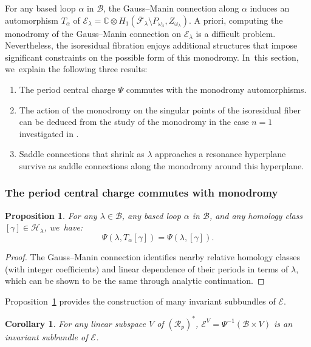 \documentclass[11pt]{article}
\newcommand{\Subsubsection}{\subsubsection}
\newcommand\calH{{\mathcal H}}
\newtheorem{cor}[thm]{Corollary}
\newtheorem{prop}[thm]{Proposition}
\theoremstyle{definition}
\begin{document}
For any based loop $\alpha$ in $\mathcal{B}$, the Gauss--Manin connection along $\alpha$ induces an automorphism
$T_{\alpha}$ of $\mathcal{E}_{\lambda} =\mathbb{C} \otimes
H_{1}(\overline{\mathcal{F}}_{\lambda} \setminus P_{\omega_{\lambda}}, Z_{\omega_{\lambda}})$. A priori, computing the monodromy of the Gauss--Manin connection on $\mathcal{E}_\lambda$ is a difficult problem. Nevertheless, the isoresidual fibration enjoys additional structures that impose significant constraints on the possible form of this monodromy. In~this section, we~explain the following three results:
\begin{enumerate}
\item The period central charge $\Psi$ commutes with the monodromy automorphisms.
\item The action of the monodromy on the singular points of the isoresidual fiber can be deduced from the study of the monodromy in the case $n=1$ investigated in \cite[\S 5]{GeTaIso}.
\item Saddle connections that shrink as $\lambda$ approaches a resonance hyperplane survive as saddle connections along the monodromy around this hyperplane.
\end{enumerate}

\Subsubsection{The period central charge commutes with monodromy}\label{subsub:commute}

\begin{prop}\label{prop:CommuteWithMonodromy}
For any $\lambda \in \mathcal{B}$, any based loop $\alpha$ in $\mathcal{B}$, and any homology class $[\gamma] \in \calH_{\lambda}$, we~have:
\[
\Psi(\lambda,T_{\alpha}[\gamma]) = \Psi(\lambda,[\gamma]).
\]
\end{prop}

\begin{proof}
The Gauss--Manin connection identifies nearby relative homology classes (with integer coefficients) and linear dependence of their periods in terms of $\lambda$, which can be shown to be the same through analytic continuation.
\end{proof}

Proposition~\ref{prop:CommuteWithMonodromy} provides the construction of many invariant subbundles of $\mathcal{E}$.

\begin{cor}\label{cor:InvariantSubbundle}
For any linear subspace $V$ of $(\mathcal{R}_{p})^{\ast}$, $\mathcal{E}^{V}=\Psi^{-1}(\mathcal{B} \times V)$ is an invariant subbundle of $\mathcal{E}$.
\end{cor}
\end{document}
